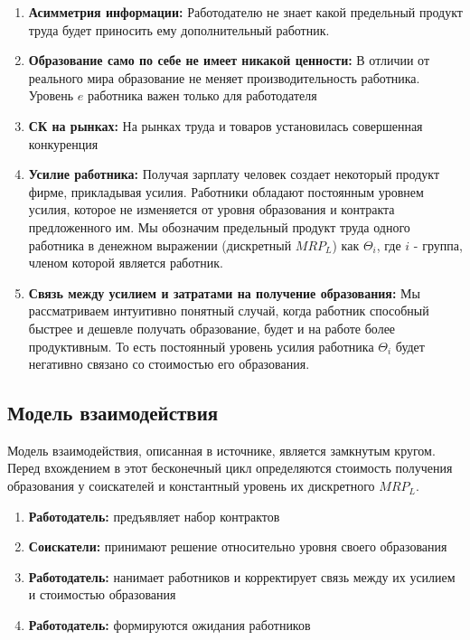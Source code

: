 \begin{enumerate}
    \item \textbf{Асимметрия информации:} Работодателю не знает какой предельный продукт труда будет приносить ему
    дополнительный работник.
    \item \textbf{Образование само по себе не имеет никакой ценности:} В отличии от реального мира образование не
    меняет производительность работника. Уровень $e$ работника важен только для работодателя
    \item \textbf{СК на рынках:} На рынках труда и товаров установилась совершенная конкуренция
    \item \textbf{Усилие работника:} Получая зарплату человек создает некоторый продукт фирме, прикладывая усилия.
    Работники обладают постоянным уровнем усилия, которое не изменяется от уровня образования и контракта
    предложенного им. Мы обозначим предельный продукт труда одного работника в денежном выражении (дискретный $MRP_L$)
    как $\Theta_i$, где $i$ - группа, членом которой является работник.
    \item \textbf{Связь между усилием и затратами на получение образования:} Мы рассматриваем интуитивно понятный
    случай, когда работник способный быстрее и дешевле получать образование, будет и на работе более продуктивным. То
    есть постоянный уровень усилия работника $\Theta_i$ будет негативно связано со стоимостью его образования.
\end{enumerate}

\subsection{Модель взаимодействия}

\indent\setlength{\parindent}{1em}Модель взаимодействия, описанная в источнике, является замкнутым кругом. Перед
вхождением в этот бесконечный цикл определяются стоимость получения образования у соискателей и константный уровень их
дискретного $MRP_L$.

\begin{enumerate}
    \item \textbf{Работодатель:} предъявляет набор контрактов
    \item \textbf{Соискатели:} принимают решение относительно уровня своего образования
    \item \textbf{Работодатель:} нанимает работников и корректирует связь между их усилием и стоимостью образования
    \item \textbf{Работодатель:} формируются ожидания работников
\end{enumerate}

